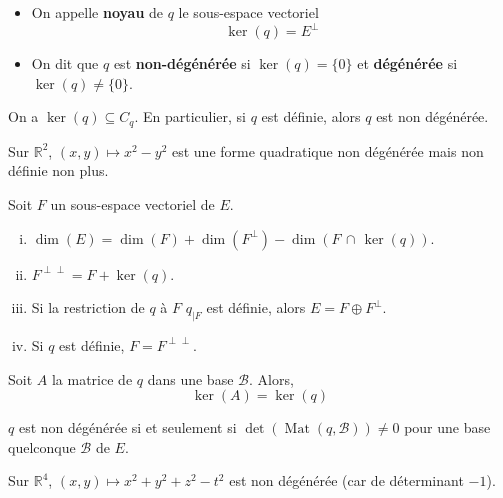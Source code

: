 	\begin{definition}
		\begin{itemize}
			\item On appelle \textbf{noyau} de $q$ le sous-espace vectoriel
			\[ \ker(q) = E^{\perp} \]
			\item On dit que $q$ est \textbf{non-dégénérée} si $\ker(q) = \{ 0 \}$ et \textbf{dégénérée} si $\ker(q) \neq \{ 0 \}$.
		\end{itemize}
	\end{definition}

	\begin{proposition}
		On a $\ker(q) \subseteq C_q$. En particulier, si $q$ est définie, alors $q$ est non dégénérée.
	\end{proposition}

	\begin{example}
		Sur $\mathbb{R}^2$, $(x, y) \mapsto x^2 - y^2$ est une forme quadratique non dégénérée mais non définie non plus.
	\end{example}

	\begin{proposition}
		Soit $F$ un sous-espace vectoriel de $E$.
		\begin{enumerate}[(i)]
			\item $\dim(E) = \dim(F) + \dim(F^\perp) - \dim(F \, \cap \, \ker(q))$.
			\item $F^{\perp\perp} = F + \ker(q)$.
			\item Si la restriction de $q$ à $F$ $q_{|F}$ est définie, alors $E = F \oplus F^{\perp}$.
			\item Si $q$ est définie, $F = F^{\perp\perp}$.
		\end{enumerate}
	\end{proposition}

	\begin{proposition}
		Soit $A$ la matrice de $q$ dans une base $\mathcal{B}$. Alors,
		\[ \ker(A) = \ker(q) \]
	\end{proposition}


	\begin{corollary}
		$q$ est non dégénérée si et seulement si $\det(\operatorname{Mat}(q, \mathcal{B})) \neq 0$ pour une base quelconque $\mathcal{B}$ de $E$.
	\end{corollary}

	\begin{example}
		Sur $\mathbb{R}^4$, $(x, y) \mapsto x^2 + y^2 + z^2 - t^2$ est non dégénérée (car de déterminant $-1$).
	\end{example}

